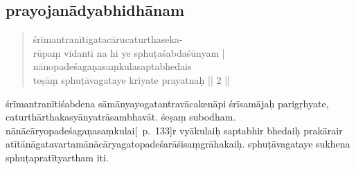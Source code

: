 \documentclass[12pt]{article}
\begin{document}
\subsection{prayojanādyabhidhānam}
\begin{quote}
	śrīmantranītigatacārucaturthaseka-\\
	rūpaṃ vidanti na hi ye sphuṭaśabdaśūnyam |\\
	nānopadeśagaṇasaṃkulasaptabhedais\\
	teṣāṃ sphuṭāvagataye kriyate prayatnaḥ || 2 ||

% 
\end{quote}

\noindent śrīmantranītiśabdena sāmānyayogatantravācakenāpi śrīsamājaḥ parigṛhyate, caturthārthakasyānyatrāsambhavāt.
śeṣaṃ subodham.
nānācāryopadeśagaṇasaṃkulai\hspace{0em}[\EDD\ p.\ 133]\hspace{0em}r vyākulaiḥ saptabhir bhedaiḥ prakārair atītānāgatavartamānācārya\footnoteB{
	°vartamānā°] \EDD ; °pravartamānā° \MS
}gatopadeśarāśisaṃgrāhakaiḥ.
sphuṭāvagataye sukhena sphuṭapratītyartham iti.
\end{document}

